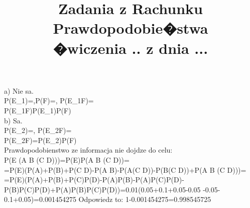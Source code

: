 \documentclass[fleqn]{article}
\begin{document}
\title{Zadania z Rachunku Prawdopodobie�stwa \\ �wiczenia .. z dnia ...}
\date{}
\medskip
{}
\medskip

a) Nie sa.\\
P(E_{1})=,P(F)=, P(E_{1}\cap F)=\\ P(E_{1}\cap F)\neq P(E_{1})P(F)\\
b) Sa.\\
P(E_{2})=, P(E_{2}\cap F)=\\
P(E_{2}\cap F)=P(E_{2})P(F)\\



\medskip
{}
\medskip
Prawdopodobienstwo ze informacja nie dojdze do celu:\\
P(E \cap (A \cup B \cup (C \cap D)))=P(E)P(A \cup B \cup (C \cap D))=\\=P(E)(P(A)+P(B)+P(C \cap D)-P(A \cap B)-P(A\cap (C \cap D))-P(B\cap (C \cap D))+P(A \cap B \cap (C \cap D)))=\\=P(E)(P(A)+P(B)+P(C)P(D)-P(A)P(B)-P(A)P(C)P(D)-P(B)P(C)P(D)+P(A)P(B)P(C)P(D))=0.01\cdot (0.05+0.1+0.05-0.05 -0.05-0.1+0.05)=0.001454275
Odpowiedz to: 1-0.001454275=0.998545725



\medskip
\end{document}
